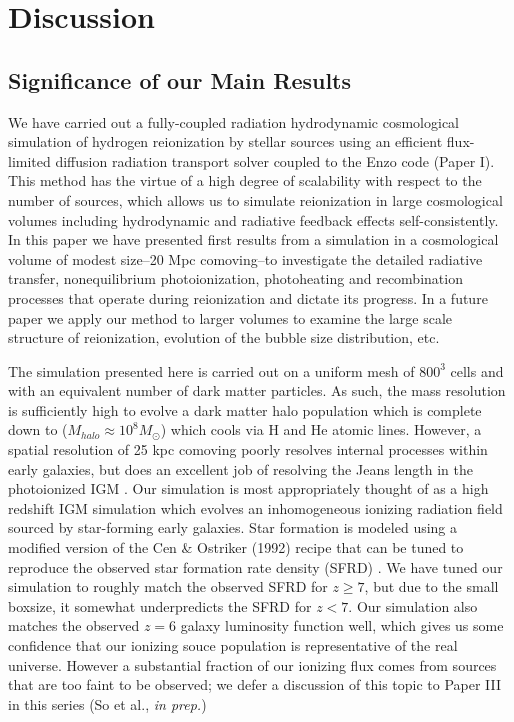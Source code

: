 \section{Discussion}
\label{Discussion}

\subsection{Significance of our Main Results}
We have carried out a fully-coupled radiation hydrodynamic cosmological simulation of hydrogen reionization by stellar sources using an efficient flux-limited diffusion radiation transport solver coupled to the Enzo code (Paper I). This method has the virtue of a high degree of scalability with respect to the number of sources, which allows us to simulate reionization in large cosmological volumes including hydrodynamic and radiative feedback effects self-consistently. In this paper we have presented first results from a simulation in a cosmological volume of modest size--20 Mpc comoving--to investigate the detailed radiative transfer, nonequilibrium photoionization, photoheating and recombination processes that operate during reionization and dictate its progress. In a future paper we apply our method to larger volumes to examine the large scale structure of reionization, evolution of the bubble size distribution, etc. 

The simulation presented here is carried out on a uniform mesh of $800^3$ cells and with an equivalent number of dark matter particles. As such, the mass resolution is sufficiently high to evolve a dark matter halo population which is complete down to ($M_{halo} \approx 10^8 M_{\odot}$) which cools via H and He atomic lines. However, a spatial resolution of 25 kpc comoving poorly resolves internal processes within early galaxies, but does an excellent job of resolving the Jeans length in the photoionized IGM \citep{BryanEtAl1999}. Our simulation is most appropriately thought of as a high redshift IGM simulation which evolves an inhomogeneous ionizing radiation field sourced by star-forming early galaxies. Star formation is modeled using a modified version of the Cen \& Ostriker (1992) recipe that can be tuned to reproduce the observed star formation rate density (SFRD) \citep{SmithEtAl2011}. We have tuned our simulation to roughly match the observed SFRD \citep{BouwensEtAl2011,RobertsonEtAl2013} for $z\geq 7$, but due to the small boxsize, it somewhat underpredicts the SFRD for $z < 7$. Our simulation also matches the observed $z=6$ galaxy luminosity function well, which gives us some confidence that our ionizing souce population is representative of the real universe. However a substantial fraction of our ionizing flux comes from sources that are too faint to be observed; we defer a discussion of this topic to Paper III in this series (So et al., {\em in prep.})

